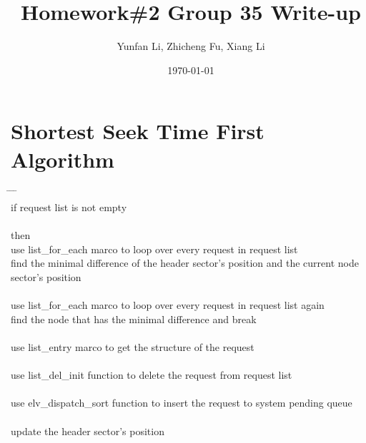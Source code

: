 \documentclass[letterpaper,10pt,titlepage]{article}
\begin{document}
\title{Homework\#2 Group 35 Write-up}
\author{Yunfan Li, Zhicheng Fu, Xiang Li}
\date{\today}
\maketitle

\section{Shortest Seek Time First Algorithm} 

\begin{tabbing}
\hspace{3em} \= \hspace{3em} \= \hspace{3em} \=\kill
\\
if request list is not empty\\
\\
then\\
    \>use list\_for\_each marco to loop over every request in request list\\
        \>\>find the minimal difference of the header sector's position and the current node sector's position\\
    \\
    \>use list\_for\_each marco to loop over every request in request list again\\
        \>\>find the node that has the minimal difference and break\\
    \\
    \>use list\_entry marco to get the structure of the request\\
    \\
    \>use list\_del\_init function to delete the request from request list\\
    \\
    \>use elv\_dispatch\_sort function to insert the request to system pending queue\\
    \\
    \>update the header sector's position\\  
\\
\end{tabbing}

%
%
%
\end{document}
